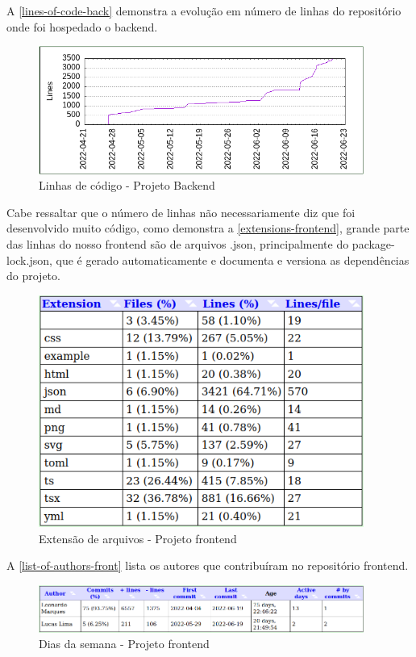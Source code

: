 A \autoref{lines-of-code-back} demonstra a evolução em número de linhas do repositório onde foi hospedado o \gls{backend}.
\begin{figure}[H]
	\centering
	\caption{\label{lines-of-code-back}Linhas de código - Projeto Backend}
	\includegraphics[width=0.95\textwidth]{../imagens/stats/lines-of-code-backend.png}
\end{figure}

Cabe ressaltar que o número de linhas não necessariamente diz que foi desenvolvido muito código, como demonstra a \autoref{extensions-frontend}, grande parte das linhas do nosso \gls{frontend} são de arquivos .json, principalmente do package-lock.json, que é gerado automaticamente e documenta e versiona as dependências do projeto.
\begin{figure}[H]
	\centering
	\caption{\label{extensions-frontend}Extensão de arquivos - Projeto \gls{frontend}}
	\includegraphics[width=0.95\textwidth]{../imagens/stats/extensions-frontend.png}
\end{figure}

A \autoref{list-of-authors-front} lista os autores que contribuíram no repositório \gls{frontend}.
\begin{figure}[H]
	\centering
	\caption{\label{list-of-authors-front}Dias da semana - Projeto \gls{frontend}}
	\includegraphics[width=0.95\textwidth]{../imagens/stats/list-of-authors-frontend.png}
\end{figure}

